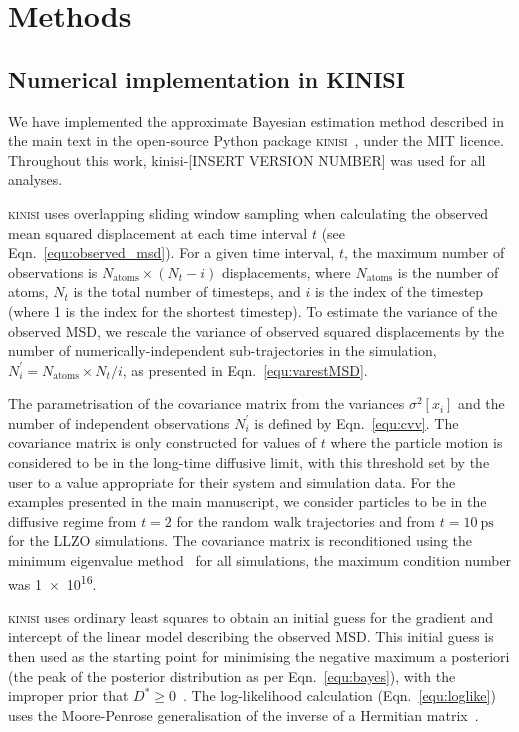 \documentclass[reprint,superscriptaddress,nobibnotes,amsmath,amssymb,aps,prx,hidelinks,linenumbers]{revtex4-2}
\newcommand{\oMSDi}{\ensuremath{x_i}}
\newcommand{\nind}[1]{\ensuremath{N^\prime_{#1}}}
\newcommand{\D}{\ensuremath{D^*}}
\newcommand{\var}[1]{\ensuremath{\sigma^2[#1]}}
\begin{document}
\section{Methods}

\subsection{Numerical implementation in KINISI}
\label{sec:implementation}
We have implemented the approximate Bayesian estimation method described in the main text in the open-source Python package \textsc{kinisi}~\cite{mccluskey_kinisi_2022}, under the MIT licence.
Throughout this work, kinisi-[INSERT VERSION NUMBER] was used for all analyses.  

\textsc{kinisi} uses overlapping sliding window sampling when calculating the observed mean squared displacement at each time interval $t$ (see Eqn.~\ref{equ:observed_msd}).
For a given time interval, $t$, the maximum number of observations is $N_{\mathrm{atoms}} \times (N_{t} - i)$ displacements, where $N_{\mathrm{atoms}}$ is the number of atoms, $N_{t}$ is the total number of timesteps, and $i$ is the index of the timestep (where \num{1} is the index for the shortest timestep).
To estimate the variance of the observed MSD, we rescale the variance of observed squared displacements by the number of numerically-independent sub-trajectories in the simulation, $\nind{i} = N_{\mathrm{atoms}} \times N_{t} / i$, as presented in Eqn.~\ref{equ:varestMSD}.  

The parametrisation of the covariance matrix from the variances $\var{\oMSDi}$ and the number of independent observations $\nind{i}$ is defined by Eqn.~\ref{equ:cvv}. 
The covariance matrix is only constructed for values of $t$ where the particle motion is considered to be in the long-time diffusive limit, with this threshold set by the user to a value appropriate for their system and simulation data. 
For the examples presented in the main manuscript, we consider particles to be in the diffusive regime from $t=\num{2}$ for the random walk trajectories and from $t=\SI{10}{\pico\second}$ for the LLZO simulations.
The covariance matrix is reconditioned using the minimum eigenvalue method~\cite{tabeart_improving_2020} for all simulations, the maximum condition number was \num{1e16}.

\textsc{kinisi} uses ordinary least squares to obtain an initial guess for the gradient and intercept of the linear model describing the observed MSD.
This initial guess is then used as the starting point for minimising the negative maximum a posteriori (the peak of the posterior distribution as per Eqn.~\ref{equ:bayes}), with the improper prior that $\D \ge 0$~\cite{broyden_convergence_1970,fletcher_new_1970,goldfarb_family_1970,shanno_conditioning_1970}.
The log-likelihood calculation (Eqn.~\ref{equ:loglike}) uses the Moore-Penrose generalisation of the inverse of a Hermitian matrix~\cite{moore_on_1920,bjerhammar_application_1951,penrose_generlized_1955}. 
\end{document}
